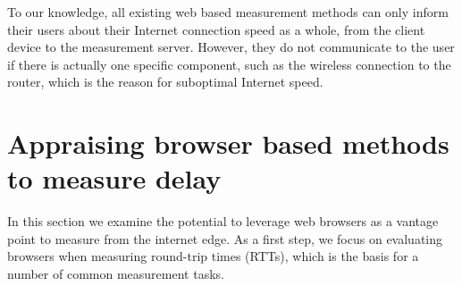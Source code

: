 \documentclass{sig-alternate-10pt}
\begin{document}
To our knowledge, all existing web based measurement methods can only inform their users about their Internet connection speed as a whole, from the client device to the measurement server. However, they do not communicate to the user if there is actually one specific component, such as the wireless connection to the router, which is the reason for suboptimal Internet speed. 


\section{Appraising browser based methods to measure delay}
\label{sec:delays}

In this section we examine the potential to leverage web browsers as a vantage point to measure from the internet edge. 
As a first step, we focus on evaluating browsers when measuring round-trip times (RTTs), which is the basis for a number of common measurement tasks. 
\end{document}
